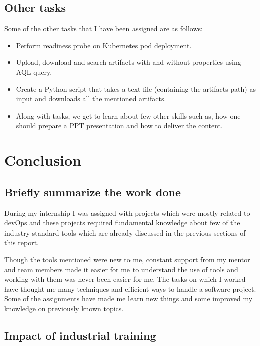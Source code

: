 \documentclass[12pt]{article}
\begin{document}
	
	\subsection{Other tasks}
Some of the other tasks that I have been assigned are as follows:	
\begin{itemize}


  \item  Perform readiness probe on Kubernetes pod deployment. 
  \item  Upload, download and search artifacts with and without properties using AQL query.
  \item  Create a Python script that takes a text file (containing the artifacts path) as input and downloads all the mentioned artifacts.
  \item Along with tasks, we get to learn about few other skills such as, how one should prepare a PPT presentation and how to deliver the content.

\end{itemize}	
	
	
	\newpage
	\section{Conclusion}
	\subsection{Briefly summarize the work done}
	
During my internship I was assigned with projects which were mostly related to devOps and these projects required fundamental knowledge about few of the industry standard tools which are already discussed in the previous sections of this report.

Though the tools mentioned were new to me, constant support from my mentor and team members made it easier for me to understand the use of tools and working with them was never been easier for me. The tasks on which I worked have thought me many techniques and efficient ways to handle a software project. Some of the assignments have made me learn new things and some improved my knowledge on previously known topics.	
	
	
	\subsection{Impact of industrial training}
	
\end{document}
